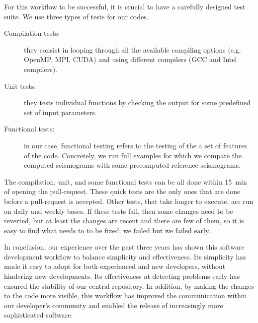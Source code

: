 For this workflow to be successful, it is crucial to have a carefully designed
test suite. We use three types of tests for our codes.
\begin{description}
\item[Compilation tests:] they consist in looping through all the available
compiling options (e.g. OpenMP, MPI, CUDA) and using different compilers
(GCC and Intel compilers).
\item[Unit tests:] they tests individual functions by checking the output for
some
  predefined set of input parameters.
\item[Functional tests:] in our case, functional testing refers to the testing
of
  the a set of features of the code. Concretely, we run full examples for which
we
  compare the computed seismograms with some precomputed reference seismograms.
\end{description}

The compilation, unit, and some functional tests can be all done within 15~min
of opening the pull-request. These quick tests are the only ones that are done
before a pull-request is accepted. Other tests, that take longer to execute, are
run on daily and weekly bases. If these tests fail, then some changes need to be
reverted, but at least the changes are recent and there are few of them, so it is
easy to find what needs to to be fixed; we failed but we failed early.

In conclusion, our experience over the past three years has shown this
software development workflow to balance simplicity and effectiveness. Its
simplicity has made it easy to adopt for both experienced and new developers,
without hindering new developments. Its effectiveness at detecting problems
early has ensured the stability of our central repository.
In addition, by making the changes to the code more visible, this workflow
has improved the communication within our developer's community and enabled the
release of increasingly more sophisticated software.
